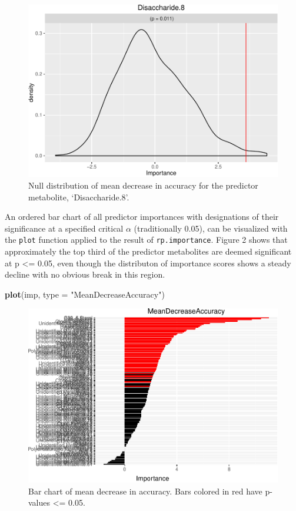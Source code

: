 \documentclass[]{article}
\newenvironment{Shaded}{\begin{snugshade}}{\end{snugshade}}
\newcommand{\KeywordTok}[1]{\textcolor[rgb]{0.13,0.29,0.53}{\textbf{{#1}}}}
\newcommand{\DataTypeTok}[1]{\textcolor[rgb]{0.13,0.29,0.53}{{#1}}}
\newcommand{\StringTok}[1]{\textcolor[rgb]{0.31,0.60,0.02}{{#1}}}
\newcommand{\NormalTok}[1]{{#1}}
\begin{document}
\begin{figure}[htbp]
\centering
\includegraphics{rfPermute_ms_files/figure-latex/plotNull-1.pdf}
\caption{Null distribution of mean decrease in accuracy for the
predictor metabolite, `Disaccharide.8'.}
\end{figure}

An ordered bar chart of all predictor importances with designations of
their significance at a specified critical \(\alpha\) (traditionally
0.05), can be visualized with the \texttt{plot} function applied to the
result of \texttt{rp.importance}. Figure 2 shows that approximately the
top third of the predictor metabolites are deemed significant at p
\textless{}= 0.05, even though the distributon of importance scores
shows a steady decline with no obvious break in this region.

\begin{Shaded}
\begin{Highlighting}[]
\KeywordTok{plot}\NormalTok{(imp, }\DataTypeTok{type =} \StringTok{"MeanDecreaseAccuracy"}\NormalTok{)}
\end{Highlighting}
\end{Shaded}

\begin{figure}[htbp]
\centering
\includegraphics{rfPermute_ms_files/figure-latex/plot_imp1-1.pdf}
\caption{Bar chart of mean decrease in accuracy. Bars colored in red
have p-values \textless{}= 0.05.}
\end{figure}
\end{document}
